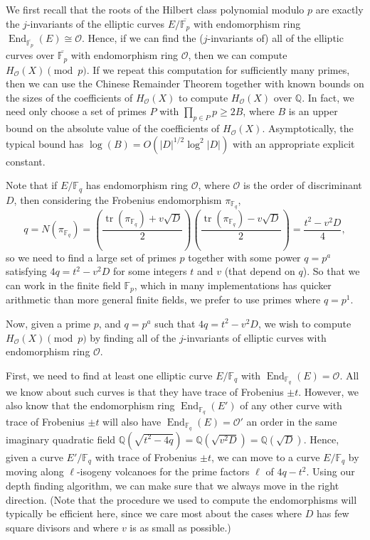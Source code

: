 \documentclass{amsart}
\theoremstyle{definition}
\theoremstyle{remark}
\numberwithin{equation}{section}
\newcommand{\cO}{\mathcal O}
\newcommand{\bbF}{\mathbb F}
\newcommand{\bbQ}{\mathbb Q}
\DeclareMathOperator{\End}{End}
\DeclareMathOperator{\tr}{tr}
\begin{document}
 We first recall that the roots of the Hilbert class polynomial modulo $p$ are exactly the $j$-invariants of the elliptic curves $E/\overline{\bbF_{p}}$ with endomorphism ring $\End_{\overline{\bbF_{p}}}(E) \cong \cO$. Hence, if we can find the ($j$-invariants of) all of the elliptic curves over $\overline{\bbF_{p}}$ with endomorphism ring $\cO$, then we can compute $H_{\cO}(X) \pmod{p}$. If we repeat this computation for sufficiently many primes, then we can use the Chinese Remainder Theorem together with known bounds on the sizes of the coefficients of $H_{\cO}(X)$ to compute $H_{\cO}(X)$ over $\bbQ$. In fact, we need only choose a set of primes $P$ with $\prod_{p \in P} p \geq 2B$, where $B$ is an upper bound on the absolute value of the coefficients of $H_{\cO}(X)$. Asymptotically, the typical bound has $\log(B) = O(|D|^{1/2} \log^2|D|)$ with an appropriate explicit constant.

 Note that if $E/\bbF_{q}$ has endomorphism ring $\cO$, where $\cO$ is the order of discriminant $D$, then considering the Frobenius endomorphism $\pi_{\bbF_{q}}$,
 \[
 q = N(\pi_{\bbF_{q}}) = \left(\frac{\tr(\pi_{\bbF_{q}}) + v \sqrt{D}}{2}\right)\left(\frac{\tr(\pi_{\bbF_{q}}) - v \sqrt{D}}{2}\right) = \frac{t^2 - v^2 D}{4},
 \]
 so we need to find a large set of primes $p$ together with some power $q = p^a$ satisfying $4q = t^2 - v^2D$ for some integers $t$ and $v$ (that depend on $q$). So that we can work in the finite field $\bbF_{p}$, which in many implementations has quicker arithmetic than more general finite fields, we prefer to use primes where $q = p^1$.%
 
 Now, given a prime $p$, and $q = p^a$ such that $4q = t^2 - v^2 D$, we wish to compute $H_{\cO}(X) \pmod{p}$ by finding all of the $j$-invariants of elliptic curves with endomorphism ring $\cO$.
 
 First, we need to find at least one elliptic curve $E/\bbF_{q}$ with $\End_{\bbF_{q}}(E) = \cO$. All we know about such curves is that they have trace of Frobenius $\pm t$. However, we also know that the endomorphism ring $\End_{\bbF_{q}}(E')$ of any other curve with trace of Frobenius $\pm t$ will also have $\End_{\bbF_{q}}(E) = \cO'$ an order in the same imaginary quadratic field $\bbQ(\sqrt{t^2 - 4q}) = \bbQ(\sqrt{v^2D}) = \bbQ(\sqrt{D})$. Hence, given a curve $E'/\bbF_{q}$ with trace of Frobenius $\pm t$, we can move to a curve $E/\bbF_{q}$ by moving along $\ell$-isogeny volcanoes for the prime factors $\ell$ of $4q - t^2$. Using our depth finding algorithm, we can make sure that we always move in the right direction. (Note that the procedure we used to compute the endomorphisms will typically be efficient here, since we care most about the cases where $D$ has few square divisors and where $v$ is as small as possible.) 
 
\end{document}
